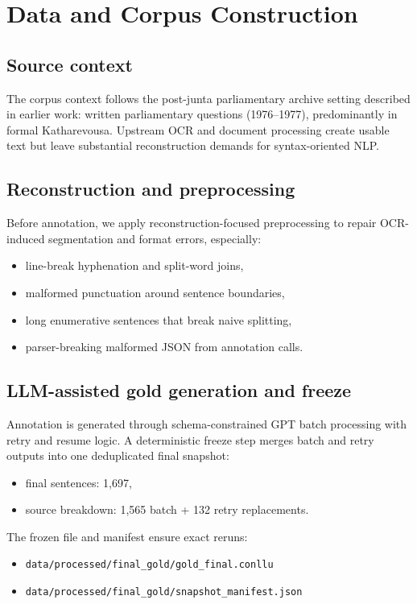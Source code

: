 \section{Data and Corpus Construction}

\subsection{Source context}

The corpus context follows the post-junta parliamentary archive setting described in earlier work: written parliamentary questions (1976--1977), predominantly in formal Katharevousa. Upstream OCR and document processing create usable text but leave substantial reconstruction demands for syntax-oriented NLP.

\subsection{Reconstruction and preprocessing}

Before annotation, we apply reconstruction-focused preprocessing to repair OCR-induced segmentation and format errors, especially:
\begin{itemize}[leftmargin=1.25em]
  \item line-break hyphenation and split-word joins,
  \item malformed punctuation around sentence boundaries,
  \item long enumerative sentences that break naive splitting,
  \item parser-breaking malformed JSON from annotation calls.
\end{itemize}

\subsection{LLM-assisted gold generation and freeze}

Annotation is generated through schema-constrained GPT batch processing with retry and resume logic. A deterministic freeze step merges batch and retry outputs into one deduplicated final snapshot:
\begin{itemize}[leftmargin=1.25em]
  \item final sentences: 1,697,
  \item source breakdown: 1,565 batch + 132 retry replacements.
\end{itemize}

The frozen file and manifest ensure exact reruns:
\begin{itemize}[leftmargin=1.25em]
  \item \texttt{data/processed/final\_gold/gold\_final.conllu}
  \item \texttt{data/processed/final\_gold/snapshot\_manifest.json}
\end{itemize}
